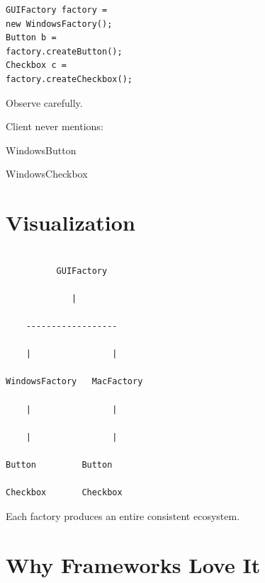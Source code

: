 \documentclass[11pt,a4paper]{book}
\begin{document}
\begin{verbatim}
GUIFactory factory =
new WindowsFactory();
Button b =
factory.createButton();
Checkbox c =
factory.createCheckbox();
\end{verbatim}


Observe carefully.


Client never mentions:


WindowsButton


WindowsCheckbox


\section{Visualization}

\begin{verbatim}

          GUIFactory

             |

    ------------------

    |                |

WindowsFactory   MacFactory

    |                |

    |                |

Button         Button

Checkbox       Checkbox

\end{verbatim}


Each factory produces an entire
consistent ecosystem.


\section{Why Frameworks Love It}
\end{document}

